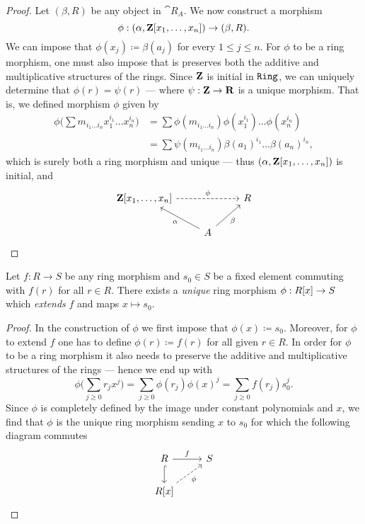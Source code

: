 %
\begin{proof}
    Let \((\beta, R)\) be any object in \(\cat R_A\). We now construct a morphism
    \[
        \phi: (\alpha, \mathbf{Z}[x_1, \dots, x_n]) \to (\beta, R).
    \]
    We can impose that \(\phi(x_j) \coloneq \beta(a_j)\) for every
    \(1 \leq j \leq n\). For \(\phi\) to be a ring morphism, one must also impose
    that is preserves both the additive and multiplicative structures of the
    rings. Since \(\mathbf{Z}\) is initial in \({\texttt{Ring}}\), we can uniquely determine that
    \(\phi(r) = \psi(r)\) --- where \(\psi: \mathbf{Z} \to \mathbf{R}\) is a unique
    morphism. That is, we defined morphism \(\phi\) given by
    \begin{align*}
        \phi\bigg( \sum m_{i_1 \dots i_n} x_1^{i_1} \dots x_n^{i_n} \bigg)
         & = \sum \phi(m_{i_1 \dots i_n}) \phi(x_1^{i_1}) \dots \phi(x_n^{i_n})    \\
         & = \sum \psi(m_{i_1 \dots i_n}) \beta(a_1)^{i_1} \dots \beta(a_n)^{i_n},
    \end{align*}
    which is surely both a ring morphism and unique --- thus \((\alpha, \mathbf{Z}[x_1,
        \dots, x_n])\) is initial, and
    \[
        \begin{tikzcd}
            \Z[x_1, \dots, x_n] \ar[rr, dashed, "\phi"] & &R \\
            &A \ar[lu, "\alpha"] \ar[ru, swap, "\beta"]   &
        \end{tikzcd}
    \]
\end{proof}
%

%
\begin{proposition}
    \label{prop:universal-property-polynomial-rings}
    Let \(f: R \to S\) be any ring morphism and \(s_0 \in S\) be a fixed element
    commuting with \(f(r)\) for all \(r \in R\). There exists a \emph{unique} ring
    morphism \(\phi: R[x] \to S\) which \emph{extends} \(f\) and maps
    \(x \mapsto s_0\).
\end{proposition}
%

%
\begin{proof}
    In the construction of \(\phi\) we first impose that \(\phi(x) \coloneq
    s_0\). Moreover, for \(\phi\) to extend \(f\) one has to define \(\phi(r)
    \coloneq f(r)\) for all given \(r \in R\). In order for \(\phi\) to be a ring
    morphism it also needs to preserve the additive and multiplicative structures of
    the rings --- hence we end up with
    \[
        \phi\bigg( \sum_{j \geq 0} r_j x^j \bigg)
        = \sum_{j \geq 0} \phi(r_j) \phi(x)^j
        = \sum_{j \geq 0} f(r_j) s_0^j.
    \]
    Since \(\phi\) is completely defined by the image under constant polynomials and
    \(x\), we find that \(\phi\) is the unique ring morphism sending \(x\) to
    \(s_0\) for which the following diagram commutes
    \[
        \begin{tikzcd}
            R \ar[d, hook] \ar[r, "f"]         & S \\
            R[x] \ar[ru, dashed, swap, "\phi"] &
        \end{tikzcd}
    \]
\end{proof}
%

